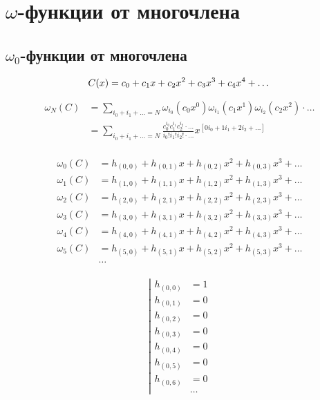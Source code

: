 
\section{$\omega$-функции от многочлена}

\subsection{$\omega_0$-функции от многочлена}

\begin{equation*}
C(x) = c_0 + c_1 x + c_2 x^2 + c_3 x^3 + c_4 x^4 + \ldots \\
\end{equation*}

\begin{equation*}\begin{aligned}
\omega_{N}(C) &= \sum_{i_0 + i_1 + \ldots = N}
{
  \omega_{i_0}(c_0 x^0)
  \omega_{i_1}(c_1 x^1)
  \omega_{i_2}(c_2 x^2)
  \cdot
  \ldots
} \\
&= \sum_{i_0 + i_1 + \ldots = N}
{
  \frac{c_0^{i_0} c_1^{i_1} c_2^{i_2} \cdot \ldots}{i_0! i_1! i_2! \cdot \ldots}
  x^{[0 i_0 + 1 i_1 + 2 i_2 + \ldots]}
} \\
\end{aligned}\end{equation*}

\begin{equation*} \begin{aligned}
\omega_{0}(C) &= h_{(0,0)} + h_{(0,1)} x + h_{(0,2)} x^2 + h_{(0,3)} x^3 + \ldots \\
\omega_{1}(C) &= h_{(1,0)} + h_{(1,1)} x + h_{(1,2)} x^2 + h_{(1,3)} x^3 + \ldots \\
\omega_{2}(C) &= h_{(2,0)} + h_{(2,1)} x + h_{(2,2)} x^2 + h_{(2,3)} x^3 + \ldots \\
\omega_{3}(C) &= h_{(3,0)} + h_{(3,1)} x + h_{(3,2)} x^2 + h_{(3,3)} x^3 + \ldots \\
\omega_{4}(C) &= h_{(4,0)} + h_{(4,1)} x + h_{(4,2)} x^2 + h_{(4,3)} x^3 + \ldots \\
\omega_{5}(C) &= h_{(5,0)} + h_{(5,1)} x + h_{(5,2)} x^2 + h_{(5,3)} x^3 + \ldots \\
&\ldots \\
\end{aligned} \end{equation*}

\begin{equation*} \left| \begin{aligned} 
h_{(0,0)} &= 1 \\ 
h_{(0,1)} &= 0 \\
h_{(0,2)} &= 0 \\
h_{(0,3)} &= 0 \\
h_{(0,4)} &= 0 \\
h_{(0,5)} &= 0 \\
h_{(0,6)} &= 0 \\
&\ldots
\end{aligned} \right. \end{equation*}

